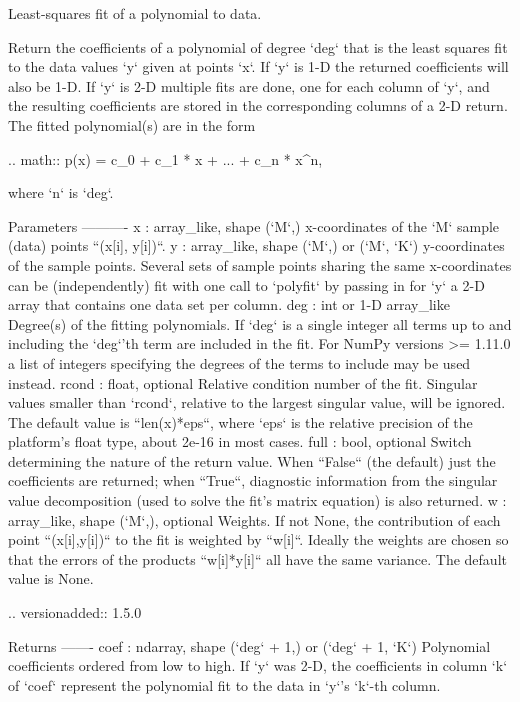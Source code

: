 \begin{DoxyVerb}Least-squares fit of a polynomial to data.

Return the coefficients of a polynomial of degree `deg` that is the
least squares fit to the data values `y` given at points `x`. If `y` is
1-D the returned coefficients will also be 1-D. If `y` is 2-D multiple
fits are done, one for each column of `y`, and the resulting
coefficients are stored in the corresponding columns of a 2-D return.
The fitted polynomial(s) are in the form

.. math::  p(x) = c_0 + c_1 * x + ... + c_n * x^n,

where `n` is `deg`.

Parameters
----------
x : array_like, shape (`M`,)
    x-coordinates of the `M` sample (data) points ``(x[i], y[i])``.
y : array_like, shape (`M`,) or (`M`, `K`)
    y-coordinates of the sample points.  Several sets of sample points
    sharing the same x-coordinates can be (independently) fit with one
    call to `polyfit` by passing in for `y` a 2-D array that contains
    one data set per column.
deg : int or 1-D array_like
    Degree(s) of the fitting polynomials. If `deg` is a single integer
    all terms up to and including the `deg`'th term are included in the
    fit. For NumPy versions >= 1.11.0 a list of integers specifying the
    degrees of the terms to include may be used instead.
rcond : float, optional
    Relative condition number of the fit.  Singular values smaller
    than `rcond`, relative to the largest singular value, will be
    ignored.  The default value is ``len(x)*eps``, where `eps` is the
    relative precision of the platform's float type, about 2e-16 in
    most cases.
full : bool, optional
    Switch determining the nature of the return value.  When ``False``
    (the default) just the coefficients are returned; when ``True``,
    diagnostic information from the singular value decomposition (used
    to solve the fit's matrix equation) is also returned.
w : array_like, shape (`M`,), optional
    Weights. If not None, the contribution of each point
    ``(x[i],y[i])`` to the fit is weighted by ``w[i]``. Ideally the
    weights are chosen so that the errors of the products ``w[i]*y[i]``
    all have the same variance.  The default value is None.

    .. versionadded:: 1.5.0

Returns
-------
coef : ndarray, shape (`deg` + 1,) or (`deg` + 1, `K`)
    Polynomial coefficients ordered from low to high.  If `y` was 2-D,
    the coefficients in column `k` of `coef` represent the polynomial
    fit to the data in `y`'s `k`-th column.


\end{DoxyVerb}
